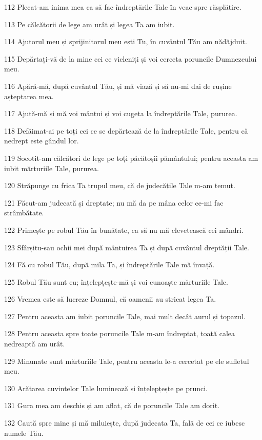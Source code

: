 \par 112 Plecat-am inima mea ca să fac îndreptările Tale în veac spre răsplătire.
\par 113 Pe călcătorii de lege am urât și legea Ta am iubit.
\par 114 Ajutorul meu și sprijinitorul meu ești Tu, în cuvântul Tău am nădăjduit.
\par 115 Depărtați-vă de la mine cei ce vicleniți și voi cerceta poruncile Dumnezeului meu.
\par 116 Apără-mă, după cuvântul Tău, și mă viază și să nu-mi dai de rușine așteptarea mea.
\par 117 Ajută-mă și mă voi mântui și voi cugeta la îndreptările Tale, pururea.
\par 118 Defăimat-ai pe toți cei ce se depărtează de la îndreptările Tale, pentru că nedrept este gândul lor.
\par 119 Socotit-am călcători de lege pe toți păcătoșii pământului; pentru aceasta am iubit mărturiile Tale, pururea.
\par 120 Străpunge cu frica Ta trupul meu, că de judecățile Tale m-am temut.
\par 121 Făcut-am judecată și dreptate; nu mă da pe mâna celor ce-mi fac strâmbătate.
\par 122 Primește pe robul Tău în bunătate, ca să nu mă clevetească cei mândri.
\par 123 Sfârșitu-sau ochii mei după mântuirea Ta și după cuvântul dreptății Tale.
\par 124 Fă cu robul Tău, după mila Ta, și îndreptările Tale mă învață.
\par 125 Robul Tău sunt eu; înțelepțește-mă și voi cunoaște mărturiile Tale.
\par 126 Vremea este să lucreze Domnul, că oamenii au stricat legea Ta.
\par 127 Pentru aceasta am iubit poruncile Tale, mai mult decât aurul și topazul.
\par 128 Pentru aceasta spre toate poruncile Tale m-am îndreptat, toată calea nedreaptă am urât.
\par 129 Minunate sunt mărturiile Tale, pentru aceasta le-a cercetat pe ele sufletul meu.
\par 130 Arătarea cuvintelor Tale luminează și înțelepțește pe prunci.
\par 131 Gura mea am deschis și am aflat, că de poruncile Tale am dorit.
\par 132 Caută spre mine și mă miluiește, după judecata Ta, fală de cei ce iubesc numele Tău.
